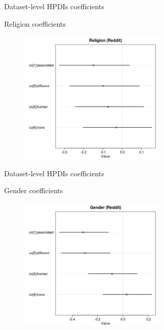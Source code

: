 \documentclass[
  10pt,
  ignorenonframetext,
  x11names, dvipsnames, bibspacing,natbib]{beamer}
\begin{document}
\begin{frame}{Dataset-level HPDIs coefficients}
\protect\hypertarget{dataset-level-hpdis-coefficients}{}
\begin{block}{Religion coefficients}
\protect\hypertarget{religion-coefficients}{}
\begin{center}
\begin{figure}[!htb]\centering
   \begin{minipage}{0.55\textwidth}
  \includegraphics[width=7cm]{../images/religionCoeffs.jpeg}
   \end{minipage}
  \end{figure}
  
\end{center}
\end{block}
\end{frame}

\begin{frame}{Dataset-level HPDIs coefficients}
\protect\hypertarget{dataset-level-hpdis-coefficients-1}{}
\begin{block}{Gender coefficients}
\protect\hypertarget{gender-coefficients}{}
\begin{center}
\begin{figure}[!htb]\centering
  \begin{minipage}{0.55\textwidth}
\includegraphics[width=7cm]{../images/genderCoeffs.jpeg}
\end{minipage}
   
\end{figure}


\end{center}
\end{block}
\end{frame}
\end{document}

